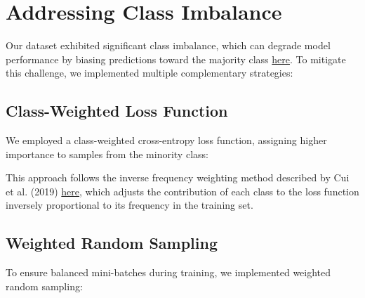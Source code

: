 \documentclass[a4paper,12pt]{article}
\begin{document}
\section{Addressing Class Imbalance}

Our dataset exhibited significant class imbalance, which can degrade model performance by biasing predictions toward the majority class \href{https://journalofbigdata.springeropen.com/articles/10.1186/s40537-019-0192-5}{here}. To mitigate this challenge, we implemented multiple complementary strategies:

\subsection{Class-Weighted Loss Function}
We employed a class-weighted cross-entropy loss function, assigning higher importance to samples from the minority class:



This approach follows the inverse frequency weighting method described by Cui et al. (2019) \href{https://openaccess.thecvf.com/content_CVPR_2019/papers/Cui_Class-Balanced_Loss_Based_on_Effective_Number_of_Samples_CVPR_2019_paper.pdf}{here}, which adjusts the contribution of each class to the loss function inversely proportional to its frequency in the training set.

\subsection{Weighted Random Sampling}
To ensure balanced mini-batches during training, we implemented weighted random sampling:


\end{document}

